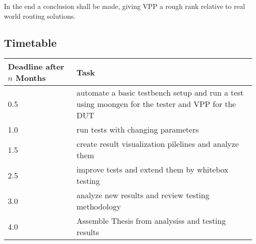\documentclass[NET,a4,12pt,ngerman]{netforms}
\begin{document}
In the end a conclusion shall be made, giving VPP a rough rank relative to real
world routing solutions.


\subsection*{Timetable}

\begin{tabular}{|l|p{10cm}|}
\hline
Deadline after $n$ Months & Task \\ \hline
0.5 & automate a basic testbench setup and run a test using moongen for
the tester and VPP for the DUT \\ \hline
1.0 & run tests with changing parameters \\ \hline
1.5 & create result visualization pilelines and analyze them \\ \hline
2.5 & improve tests and extend them by whitebox testing \\ \hline
3.0 & analyze new results and review testing methodology \\ \hline
4.0 & Assemble Thesis from analysiss and testing results \\ \hline
\end{tabular}



\end{document}
